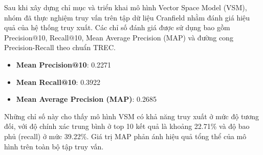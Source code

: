 Sau khi xây dựng chỉ mục và triển khai mô hình Vector Space Model (VSM), nhóm đã thực nghiệm truy vấn trên tập dữ liệu Cranfield nhằm đánh giá hiệu quả của hệ thống truy xuất. Các chỉ số đánh giá được sử dụng bao gồm Precision@10, Recall@10, Mean Average Precision (MAP) và đường cong Precision-Recall theo chuẩn TREC.

\begin{itemize}
    \item \textbf{Mean Precision@10}: 0.2271
    \item \textbf{Mean Recall@10}: 0.3922
    \item \textbf{Mean Average Precision (MAP)}: 0.2685
\end{itemize}

Những chỉ số này cho thấy mô hình VSM có khả năng truy xuất ở mức độ tương đối, với độ chính xác trung bình ở top 10 kết quả là khoảng 22.71\% và độ bao phủ (recall) ở mức 39.22\%. Giá trị MAP phản ánh hiệu quả tổng thể của mô hình trên toàn bộ tập truy vấn.
